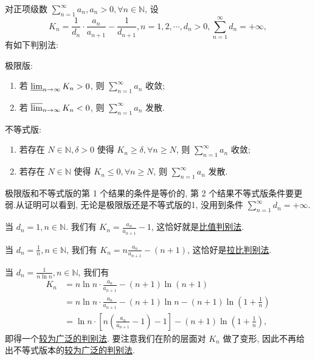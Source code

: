 \documentclass[../../main.tex]{subfiles}
\begin{document}
\begin{theorem}[Kummer链]\label{theorem:Kummer链}
对正项级数 \( \sum_{n=1}^\infty a_n, a_n > 0, \forall n \in \mathbb{N} \), 设
\[
K_n = \frac{1}{d_n} \cdot \frac{a_n}{a_{n + 1}} - \frac{1}{d_{n + 1}}, n = 1, 2, \cdots, d_n > 0, \sum_{n=1}^\infty d_n = +\infty,
\]
有如下判别法:

极限版:
\begin{enumerate}
\item 若 \( \varliminf_{n \to \infty} K_n > 0 \), 则 \( \sum_{n=1}^\infty a_n \) 收敛;
\item 若 \( \varlimsup_{n \to \infty} K_n < 0 \), 则 \( \sum_{n=1}^\infty a_n \) 发散.
\end{enumerate}

不等式版:
\begin{enumerate}
\item 若存在 \( N \in \mathbb{N}, \delta > 0 \) 使得 \( K_n \geqslant \delta, \forall n \geqslant N \), 则 \( \sum_{n=1}^\infty a_n \) 收敛;

\item 若存在 \( N \in \mathbb{N} \) 使得 \( K_n \leqslant 0, \forall n \geqslant N \), 则 \( \sum_{n=1}^\infty a_n \) 发散.
\end{enumerate}
\end{theorem}
\begin{note}
极限版和不等式版的第 1 个结果的条件是等价的, 第 2 个结果不等式版条件要更弱.从证明可以看到, 无论是极限版还是不等式版的1, 没用到条件 \( \sum_{n=1}^\infty d_n = +\infty \).
\end{note}
\begin{remark}
当 \( d_n = 1, n \in \mathbb{N} \). 我们有 \( K_n = \frac{a_n}{a_{n + 1}} - 1 \), 这恰好就是\hyperref[theorem:级数-比值判别法]{比值判别法}.

当 \( d_n = \frac{1}{n}, n \in \mathbb{N} \), 我们有 \( K_n = n \frac{a_n}{a_{n + 1}} - (n + 1) \), 这恰好是\hyperref[theorem:拉比判别法]{拉比判别法}.

当 \( d_n = \frac{1}{n \ln n}, n \in \mathbb{N} \), 我们有
\begin{align*}
K_n &= n \ln n \cdot \frac{a_n}{a_{n + 1}} - (n + 1) \ln (n + 1)
\\
&= n \ln n \cdot \frac{a_n}{a_{n + 1}} - (n + 1) \ln n - (n + 1) \ln \left( 1 + \frac{1}{n} \right)
\\
&= \ln n \cdot \left[ n \left( \frac{a_n}{a_{n + 1}} - 1 \right) - 1 \right] - (n + 1) \ln \left( 1 + \frac{1}{n} \right),
\end{align*}
即得一个\hyperref[theorem:较为广泛的判别法]{较为广泛的判别法}. 要注意我们在阶的层面对 \( K_n \) 做了变形, 因此不再给出不等式版本的\hyperref[theorem:较为广泛的判别法]{较为广泛的判别法}.
\end{remark}
\end{document}
